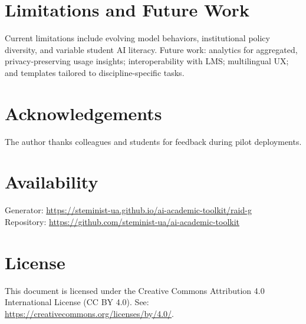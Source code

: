 \documentclass[11pt,a4paper]{article}
\newcommand{\githubrepo}{https://github.com/steminist-ua/ai-academic-toolkit}
\newcommand{\generatorurl}{https://steminist-ua.github.io/ai-academic-toolkit/raid-g}
\begin{document}
\section{Limitations and Future Work}
Current limitations include evolving model behaviors, institutional policy diversity, and variable student AI literacy. Future work: analytics for aggregated, privacy-preserving usage insights; interoperability with LMS; multilingual UX; and templates tailored to discipline-specific tasks.

\section*{Acknowledgements}
The author thanks colleagues and students for feedback during pilot deployments.

\section*{Availability}
\noindent Generator: \url{\generatorurl} \\
Repository: \url{\githubrepo}

\section*{License}
This document is licensed under the Creative Commons Attribution 4.0 International License (CC BY 4.0). See: \url{https://creativecommons.org/licenses/by/4.0/}.
\end{document}
